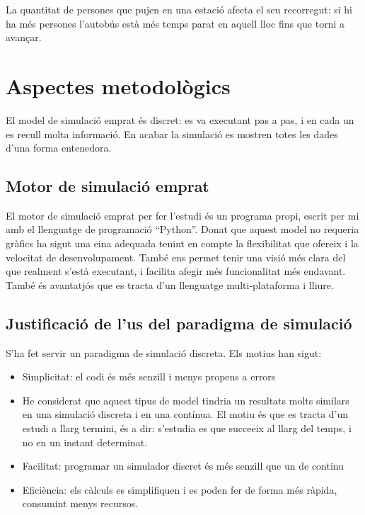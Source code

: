 \documentclass[a4paper,10pt]{article}
\begin{document}
La quantitat de persones que pujen en una estació afecta el seu recorregut: si hi ha més persones l'autobús està més temps parat en aquell lloc fins que torni a avançar.

\section{Aspectes metodològics}

El model de simulació emprat és discret: es va executant pas a pas, i en cada un es recull molta informació. En acabar la simulació es mostren totes les dades d'una forma entenedora.

\subsection{Motor de simulació emprat}

El motor de simulació emprat per fer l'estudi és un programa propi, escrit per mi amb el llenguatge de programació ``Python''. Donat que aquest model no requeria gràfics ha sigut una eina adequada tenint en compte la flexibilitat que ofereix i la velocitat de desenvolupament. També ens permet tenir una visió més clara del que realment s'està executant, i facilita afegir més funcionalitat més endavant. També és avantatjós que es tracta d'un llenguatge multi-plataforma i lliure.

\subsection{Justificació de l'us del paradigma de simulació}

S'ha fet servir un paradigma de simulació discreta. Els motius han sigut:
\begin{itemize}
 \item Simplicitat: el codi és més senzill i menys propens a errors
 \item He considerat que aquest tipus de model tindria un resultats molts similars en una simulació discreta i en una contínua. El motiu és que es tracta d'un estudi a llarg termini, és a dir: s'estudia es que succeeix al llarg del temps, i no en un instant determinat. 
 \item Facilitat: programar un simulador discret és més senzill que un de continu
 \item Eficiència: els càlculs es simplifiquen i es poden fer de forma més ràpida, consumint menys recursos.
\end{itemize}
\end{document}
